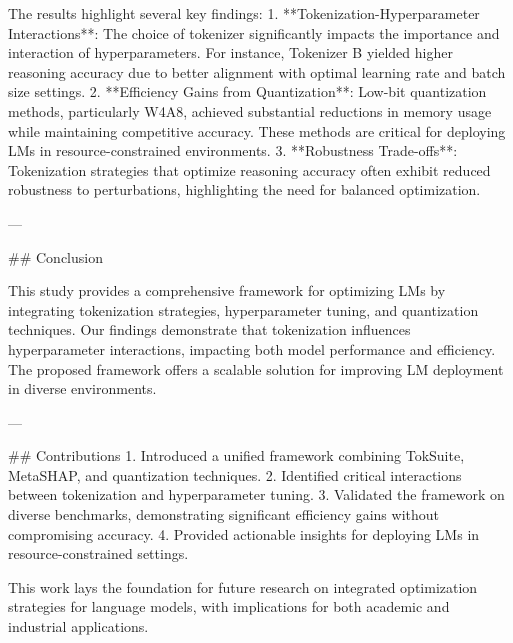 The results highlight several key findings:  
1. **Tokenization-Hyperparameter Interactions**: The choice of tokenizer significantly impacts the importance and interaction of hyperparameters. For instance, Tokenizer B yielded higher reasoning accuracy due to better alignment with optimal learning rate and batch size settings.  
2. **Efficiency Gains from Quantization**: Low-bit quantization methods, particularly W4A8, achieved substantial reductions in memory usage while maintaining competitive accuracy. These methods are critical for deploying LMs in resource-constrained environments.  
3. **Robustness Trade-offs**: Tokenization strategies that optimize reasoning accuracy often exhibit reduced robustness to perturbations, highlighting the need for balanced optimization.  

---

## Conclusion  

This study provides a comprehensive framework for optimizing LMs by integrating tokenization strategies, hyperparameter tuning, and quantization techniques. Our findings demonstrate that tokenization influences hyperparameter interactions, impacting both model performance and efficiency. The proposed framework offers a scalable solution for improving LM deployment in diverse environments.  

---

## Contributions  
1. Introduced a unified framework combining TokSuite, MetaSHAP, and quantization techniques.  
2. Identified critical interactions between tokenization and hyperparameter tuning.  
3. Validated the framework on diverse benchmarks, demonstrating significant efficiency gains without compromising accuracy.  
4. Provided actionable insights for deploying LMs in resource-constrained settings.  

This work lays the foundation for future research on integrated optimization strategies for language models, with implications for both academic and industrial applications.  